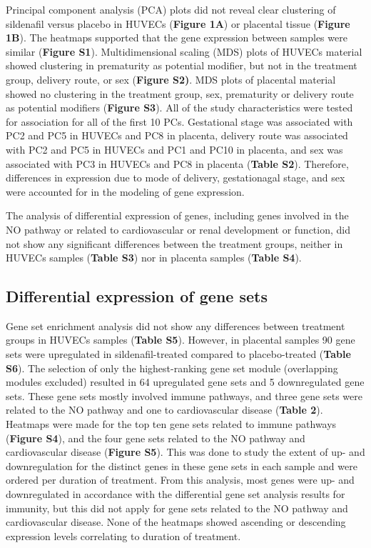 \documentclass[authordate, empirical]{jote-new-article}
\begin{document}
	Principal component analysis (PCA) plots did not reveal clear clustering of sildenafil versus placebo in HUVECs (\textbf{Figure 1A}) or placental tissue (\textbf{Figure 1B}). The heatmaps supported that the gene expression between samples were similar (\textbf{Figure S1}). Multidimensional scaling (MDS) plots of HUVECs material showed clustering in prematurity as potential modifier, but not in the treatment group, delivery route, or sex (\textbf{Figure S2)}. MDS plots of placental material showed no clustering in the treatment group, sex, prematurity or delivery route as potential modifiers (\textbf{Figure S3}). All of the study characteristics were tested for association for all of the first 10 PCs. Gestational stage was associated with PC2 and PC5 in HUVECs and PC8 in placenta, delivery route was associated with PC2 and PC5 in HUVECs and PC1 and PC10 in placenta, and sex was associated with PC3 in HUVECs and PC8 in placenta (\textbf{Table S2}). Therefore, differences in expression due to mode of delivery, gestationagal stage, and sex were accounted for in the modeling of gene expression.



	The analysis of differential expression of genes, including genes involved in the NO pathway or related to cardiovascular or renal development or function, did not show any significant differences between the treatment groups, neither in HUVECs samples (\textbf{Table S3}) nor in placenta samples (\textbf{Table S4}).


	\subsection{Differential expression of gene sets}



	Gene set enrichment analysis did not show any differences between treatment groups in HUVECs samples (\textbf{Table S5}). However, in placental samples 90 gene sets were upregulated in sildenafil-treated compared to placebo-treated (\textbf{Table S6}). The selection of only the highest-ranking gene set module (overlapping modules excluded) resulted in 64 upregulated gene sets and 5 downregulated gene sets. These gene sets mostly involved immune pathways, and three gene sets were related to the NO pathway and one to cardiovascular disease (\textbf{Table 2}). Heatmaps were made for the top ten gene sets related to immune pathways (\textbf{Figure S4}), and the four gene sets related to the NO pathway and cardiovascular disease (\textbf{Figure S5}). This was done to study the extent of up- and downregulation for the distinct genes in these gene sets in each sample and were ordered per duration of treatment. From this analysis, most genes were up- and downregulated in accordance with the differential gene set analysis results for immunity, but this did not apply for gene sets related to the NO pathway and cardiovascular disease. None of the heatmaps showed ascending or descending expression levels correlating to duration of treatment.
\end{document}
